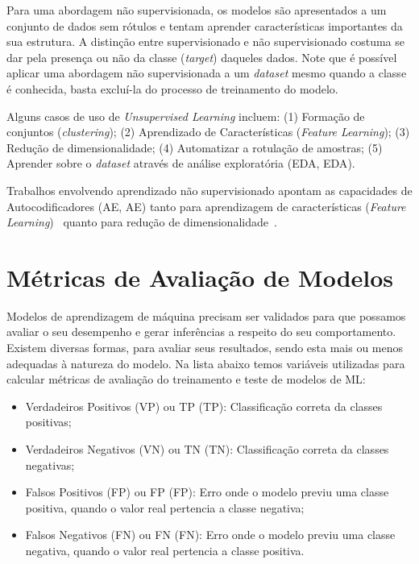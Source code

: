 Para uma abordagem não supervisionada, os modelos são apresentados a um conjunto de dados sem rótulos e tentam aprender características importantes da sua estrutura. A distinção entre supervisionado e não supervisionado costuma se dar pela presença ou não da classe (\textit{target}) daqueles dados. Note que é possível aplicar uma abordagem não supervisionada a um \textit{dataset} mesmo quando a classe é conhecida, basta excluí-la do processo de treinamento do modelo.

Alguns casos de uso de \textit{Unsupervised Learning} incluem: (1) Formação de conjuntos (\textit{clustering}); (2) Aprendizado de Características (\textit{Feature Learning}); (3) Redução de dimensionalidade; (4) Automatizar a rotulação de amostras; (5) Aprender sobre o \textit{dataset} através de análise exploratória (\acrlong{EDA}, \acrshort{EDA}).

Trabalhos envolvendo aprendizado não supervisionado apontam as capacidades de Autocodificadores (\acrlong{AE}, \acrshort{AE}) tanto para aprendizagem de características (\textit{Feature Learning})~\cite{35.16, 35.17} quanto para redução de dimensionalidade~\cite{35.18, 35.19}.


\section{Métricas de Avaliação de Modelos}\label{sec:metricas}

Modelos de aprendizagem de máquina precisam ser validados para que possamos avaliar o seu desempenho e gerar inferências a respeito do seu comportamento. Existem diversas formas, para avaliar seus resultados, sendo esta mais ou menos adequadas à natureza do modelo. Na lista abaixo temos variáveis utilizadas para calcular métricas de avaliação do treinamento e teste de modelos de \acrshort{ML}:

\begin{itemize}
    \item Verdadeiros Positivos (VP) ou \acrlong{TP} (\acrshort{TP}): Classificação correta da classes positivas;
    \item Verdadeiros Negativos (VN) ou \acrlong{TN} (\acrshort{TN}): Classificação correta da classes negativas;
    \item Falsos Positivos (FP) ou \acrlong{FP} (\acrshort{FP}): Erro onde o modelo previu uma classe positiva, quando o valor real pertencia a classe negativa;
    \item Falsos Negativos (FN) ou \acrlong{FN} (\acrshort{FN}): Erro onde o modelo previu uma classe negativa, quando o valor real pertencia a classe positiva.
\end{itemize}

